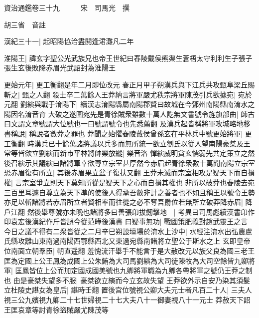 資治通鑑卷三十九　　　宋　司馬光　撰

胡三省　音註

漢紀三十一|{
	起昭陽協洽盡閼逢涒灘凡二年}


淮陽王|{
	諱玄字聖公光武族兄也帝王世紀曰舂陵戴侯熊渠生蒼梧太守利利生子張子張生玄後敗降赤眉光武詔封為淮陽王}


更始元年|{
	更工衡翻是年二月即位改元}
春正月甲子朔漢兵與下江兵共攻甄阜梁丘賜斬之|{
	甄之人翻}
殺士卒二萬餘人王莽納言將軍嚴尤秩宗將軍陳茂引兵欲據宛|{
	宛於元翻}
劉縯與戰于淯陽下|{
	續漢志淯陽縣屬南陽郡賢曰故城在今鄧州南陽縣南淯水之陽因名淯音育}
大破之遂圍宛先是青徐賊衆雖數十萬人訖無文書號令旌旗部曲|{
	師古曰文謂文章號謂大位號也一曰號謂號令也先悉薦翻}
及漢兵起皆稱將軍攻城略地移書稱說|{
	稱說者數莽之罪也}
莽聞之始懼舂陵戴侯曾孫玄在平林兵中號更始將軍|{
	更工衡翻}
時漢兵已十餘萬諸將議以兵多而無所統一欲立劉氏以從人望南陽豪桀及王常等皆欲立劉縯而新市平林將帥樂放縱|{
	樂音洛}
憚縯威明貪玄懦弱先共定策立之然後召縯示其議縯曰諸將軍幸欲尊立宗室甚厚然今赤眉起青徐衆數十萬聞南陽立宗室恐赤眉復有所立|{
	其後赤眉果立盆子復扶又翻}
王莽未滅而宗室相攻是疑天下而自損權|{
	言宗室爭立則天下莫知所從是疑天下之心而自損其權也}
非所以破莽也舂陵去宛三百里耳遽自尊立為天下凖的使後人得承吾敝非計之善者也不如且稱王以號令王勢亦足以斬諸將若赤眉所立者賢相率而往從之必不奪吾爵位若無所立破莽降赤眉|{
	降戶江翻}
然後舉尊號亦未晩也諸將多曰善張卬拔劒擊地　|{
	考異曰司馬彪續漢書卬作印袁宏後漢紀作斤皆誤今從范曄後漢書}
曰疑事無功|{
	戰國策肥義對趙武靈王之言}
今日之議不得有二衆皆從之二月辛巳朔設壇場於淯水上沙中|{
	水經注淯水出弘農盧氏縣攻離山東南過南陽西鄂縣西北又東過宛縣南諸將立聖公于斯水之上}
玄即皇帝位南面立朝羣臣|{
	朝直遥翻}
羞愧流汗舉手不能言于是大赦改元以族父良為國三老王匡為定國上公王鳳為成國上公朱鮪為大司馬劉縯為大司徒陳牧為大司空餘皆九卿將軍|{
	匡鳳皆位上公而加定國成國美號也九卿將軍職為九卿各帶將軍之號仍王莽之制也}
由是豪桀失望多不服|{
	豪桀欲立縯而今立玄故失望}
王莽欲外示自安乃染其須髮立杜陵史諶女為皇后|{
	諶時壬翻}
置後宫位號視公卿大夫元士者凡百二十人|{
	三夫人視三公九嬪視九卿二十七世婦視二十七大夫八十一御妻視八十一元士}
莽赦天下詔王匡哀章等討青徐盜賊嚴尤陳茂等

